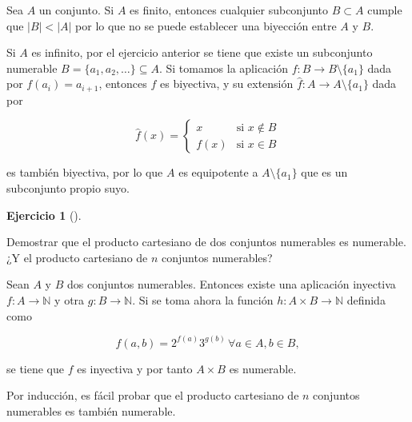 \documentclass[
  a4paper,
]{scrreport}
\theoremstyle{definition}
\newtheorem{exercise}{Ejercicio}[chapter]
\theoremstyle{remark}
\begin{document}
\begin{tcolorbox}[enhanced jigsaw, coltitle=black, left=2mm, opacityback=0, colback=white, opacitybacktitle=0.6, breakable, colbacktitle=quarto-callout-tip-color!10!white, leftrule=.75mm, toptitle=1mm, arc=.35mm, bottomtitle=1mm, rightrule=.15mm, titlerule=0mm, title=\textcolor{quarto-callout-tip-color}{\faLightbulb}\hspace{0.5em}{Solución}, colframe=quarto-callout-tip-color-frame, toprule=.15mm, bottomrule=.15mm]
Sea \(A\) un conjunto. Si \(A\) es finito, entonces cualquier
subconjunto \(B\subset A\) cumple que \(|B| < |A|\) por lo que no se
puede establecer una biyección entre \(A\) y \(B\).

Si \(A\) es infinito, por el ejercicio anterior se tiene que existe un
subconjunto numerable \(B=\{a_1,a_2,\ldots\}\subseteq A\). Si tomamos la
aplicación \(f:B\to B\setminus\{a_1\}\) dada por \(f(a_i)=a_{i+1}\),
entonces \(f\) es biyectiva, y su extensión
\(\hat f: A\to A\setminus\{a_1\}\) dada por

\[
\hat f(x)=
\begin{cases}
x & \mbox{si } x\not\in B\\
f(x) & \mbox{si } x\in B
\end{cases}
\]

es también biyectiva, por lo que \(A\) es equipotente a
\(A\setminus \{a_1\}\) que es un subconjunto propio suyo.
\end{tcolorbox}

\leavevmode{}%
\begin{exercise}[]\label{exr-producto-cartesiano-numerable}

Demostrar que el producto cartesiano de dos conjuntos numerables es
numerable. ¿Y el producto cartesiano de \(n\) conjuntos numerables?

\end{exercise}

\begin{tcolorbox}[enhanced jigsaw, coltitle=black, left=2mm, opacityback=0, colback=white, opacitybacktitle=0.6, breakable, colbacktitle=quarto-callout-tip-color!10!white, leftrule=.75mm, toptitle=1mm, arc=.35mm, bottomtitle=1mm, rightrule=.15mm, titlerule=0mm, title=\textcolor{quarto-callout-tip-color}{\faLightbulb}\hspace{0.5em}{Solución}, colframe=quarto-callout-tip-color-frame, toprule=.15mm, bottomrule=.15mm]
Sean \(A\) y \(B\) dos conjuntos numerables. Entonces existe una
aplicación inyectiva \(f:A\to\mathbb{N}\) y otra \(g:B\to\mathbb{N}\).
Si se toma ahora la función \(h:A\times B\to \mathbb{N}\) definida como

\[ f(a,b) = 2^{f(a)}3^{g(b)}\, \forall a\in A, b\in B,\]

se tiene que \(f\) es inyectiva y por tanto \(A\times B\) es numerable.

Por inducción, es fácil probar que el producto cartesiano de \(n\)
conjuntos numerables es también numerable.
\end{tcolorbox}
\end{document}
